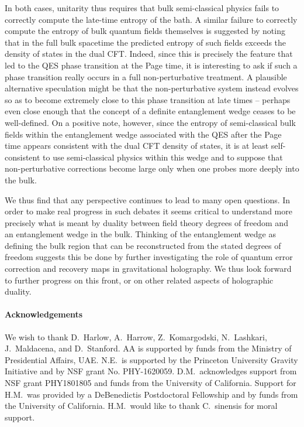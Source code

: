 \documentclass[12pt]{article}
\begin{document}
In both cases, unitarity thus requires that bulk semi-classical physics fails to correctly compute the late-time entropy of the bath.  A similar failure to correctly compute the
entropy of bulk quantum fields themselves is suggested by noting that in the full bulk spacetime the predicted entropy of such fields exceeds the density of states in the dual CFT.  Indeed, since this is precisely the feature that led to the QES phase transition at the Page time, it is interesting to ask if such a phase transition really occurs in a full non-perturbative treatment.  A plausible alternative speculation might be that the non-perturbative system instead evolves so as to become extremely close to this phase transition at late times -- perhaps even close enough that the concept of a definite entanglement wedge ceases to be well-defined.  On a positive note, however, since the entropy of semi-classical bulk fields within the entanglement wedge associated with the QES after the Page time appears consistent with the dual CFT density of states, it is at least self-consistent to use semi-classical physics within this wedge and to suppose that non-perturbative corrections become large only when one probes more deeply into the bulk.

We thus find that any perspective continues to lead to many open questions.
In order to make real progress in such debates it seems critical to understand more precisely what is meant by duality between field theory degrees of freedom and an entanglement wedge in the bulk.  Thinking of the entanglement wedge as defining the bulk region that can be reconstructed from the stated degrees of freedom suggests this be done by further investigating the role of quantum error correction and recovery maps in gravitational holography.  We thus look forward to further progress on this front, or on other related aspects of holographic duality.




\paragraph{ Acknowledgements} We wish to thank  D.~Harlow, A.~Harrow, Z.~Komargodski, N.~Lashkari, J.~Maldacena, and D.~Stanford.  AA is supported by funds from the Ministry of Presidential Affairs, UAE. N.E.~is supported by the Princeton University Gravity Initiative  and by NSF grant No. PHY-1620059.  D.M.~acknowledges support from NSF grant PHY1801805 and funds from the University of California.  Support for H.M.~was provided by a DeBenedictis Postdoctoral Fellowship and by funds from the University of California. H.M.~would like to thank C.~sinensis for moral support.












\end{document}
